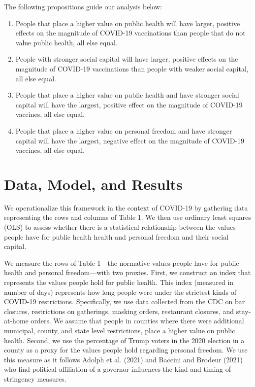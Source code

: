 \documentclass[
]{article}
\begin{document}
The following propositions guide our analysis below:

\begin{enumerate}
\def\labelenumi{\arabic{enumi}.}
\item
  People that place a higher value on public health will have larger,
  positive effects on the magnitude of COVID-19 vaccinations than people
  that do not value public health, all else equal.
\item
  People with stronger social capital will have larger, positive effects
  on the magnitude of COVID-19 vaccinations than people with weaker
  social capital, all else equal.
\item
  People that place a higher value on public health and have stronger
  social capital will have the largest, positive effect on the magnitude
  of COVID-19 vaccines, all else equal.
\item
  People that place a higher value on personal freedom and have stronger
  capital will have the largest, negative effect on the magnitude of
  COVID-19 vaccines, all else equal.
\end{enumerate}

\hypertarget{data-model-and-results}{%
\section{Data, Model, and Results}\label{data-model-and-results}}

We operationalize this framework in the context of COVID-19 by gathering
data representing the rows and columns of Table 1. We then use ordinary
least squares (OLS) to assess whether there is a statistical
relationship between the values people have for public health health and
personal freedom and their social capital.

We measure the rows of Table 1---the normative values people have for
public health and personal freedom---with two proxies. First, we
construct an index that represents the values people hold for public
health. This index (measured in number of days) represents how long
people were under the strictest kinds of COVID-19 restrictions.
Specifically, we use data collected from the CDC on bar closures,
restrictions on gatherings, masking orders, restaurant closures, and
stay-at-home orders. We assume that people in counties where there were
additional municipal, county, and state level restrictions, place a
higher value on public health. Second, we use the percentage of Trump
voters in the 2020 election in a county as a proxy for the values people
hold regarding personal freedom. We use this measure as it follows
Adolph et al. (2021) and Baccini and Brodeur (2021) who find political
affiliation of a governor influences the kind and timing of stringency
measures.
\end{document}
